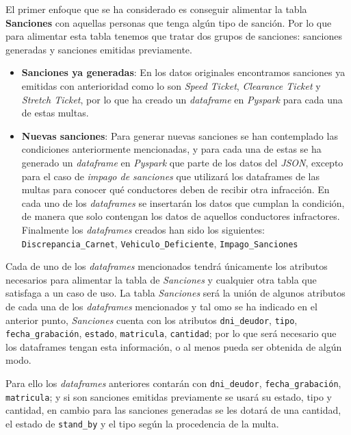 \documentclass[]{article}
\begin{document}
El primer enfoque que se ha considerado es conseguir alimentar la tabla \textbf{Sanciones} con aquellas personas que tenga algún tipo de sanción. Por lo que para alimentar esta tabla tenemos que tratar dos grupos de sanciones: sanciones generadas y sanciones emitidas previamente.
\begin{itemize}
    \item \textbf{Sanciones ya generadas}: En los datos originales encontramos sanciones ya emitidas con anterioridad como lo son \textit{Speed Ticket}, \textit{Clearance Ticket} y \textit{Stretch Ticket}, por lo que ha creado un \textit{dataframe} en \textit{Pyspark} para cada una de estas multas.
    \item \textbf{Nuevas sanciones}: Para generar nuevas sanciones se han contemplado las condiciones anteriormente mencionadas, y para cada una de estas se ha generado un \textit{dataframe} en \textit{Pyspark} que parte de los datos del \textit{JSON}, excepto para el caso de \textit{impago de sanciones} que utilizará los dataframes de las multas para conocer qué conductores deben de recibir otra infracción. En cada uno de los \textit{dataframes} se insertarán los datos que cumplan la condición, de manera que solo contengan los datos de aquellos conductores infractores. Finalmente los \textit{dataframes} creados han sido los siguientes: \texttt{Discrepancia\_Carnet}, \texttt{Vehiculo\_Deficiente}, \texttt{Impago\_Sanciones}
\end{itemize}


Cada de uno de los \textit{dataframes} mencionados tendrá únicamente los atributos necesarios para alimentar la tabla de \textit{Sanciones} y cualquier otra tabla que satisfaga a un caso de uso.
La tabla \textit{Sanciones} será la unión de algunos atributos de cada una de los \textit{dataframes} mencionados y tal omo se ha indicado en el anterior punto, \textit{Sanciones} cuenta con los atributos \texttt{dni\_deudor}, \texttt{tipo}, \texttt{fecha\_grabación}, \texttt{estado}, \texttt{matricula}, \texttt{cantidad}; por lo que será necesario que los dataframes tengan esta información, o al menos pueda ser obtenida de algún modo.
\newline

Para ello los \textit{dataframes} anteriores contarán con \texttt{dni\_deudor}, \texttt{fecha\_grabación}, \texttt{matricula}; y si son sanciones emitidas previamente se usará su estado, tipo y cantidad, en cambio para las sanciones generadas se les dotará de una cantidad, el estado de \texttt{stand\_by} y el tipo según la procedencia de la multa.
\newline
\end{document}
